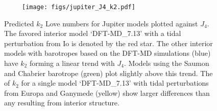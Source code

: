 \begin{figure}[h!]  
  \centering
    \texttt{[image: figs/jupiter\_J4\_k2.pdf]}
\caption{ Predicted $k_2$ Love numbers for Jupiter models plotted against $J_4$. The
    favored interior model `DFT-MD\_7.13' with a tidal perturbation from Io is
    denoted by the red star. The other interior models with barotropes based on the
    DFT-MD simulations (blue) have $k_2$ forming a linear trend with $J_4$.  Models
    using the Saumon and Chabrier barotrope (green) plot slightly above this trend.
    The of $k_2$ for a single model `DFT-MD\_7.13' with tidal perturbations from
    Europa and Ganymede (yellow) show larger differences than any resulting from
    interior structure.
    \label{fig:J4_k2}}
\end{figure}




